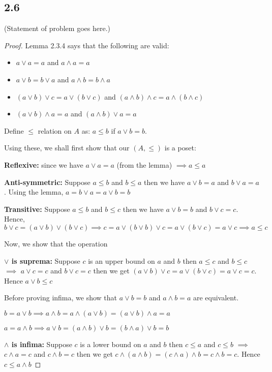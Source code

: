 \documentclass[12pt]{article}
\begin{document}
\subsection*{2.6}
(Statement of problem goes here.)\\

\begin{proof}
Lemma 2.3.4 says that the following are valid:
\begin{itemize}
    \item $a \vee a = a$ and $a \wedge a = a$
    \item $a \vee b = b \vee a$ and $a \wedge b = b \wedge a$
    \item $(a \vee b) \vee c = a \vee (b \vee c)$ and $(a \wedge b) \wedge c = a \wedge (b \wedge c)$
    \item $(a \vee b) \wedge a = a$ and $(a \wedge b) \vee a = a$
\end{itemize}

Define $\leq$ relation on $A$ as: $a \leq b$ if $a \vee b = b$.

Using these, we shall first show that our $(A, \leq)$ is a poset:

\textbf{Reflexive:} since we have $a \vee a = a$ (from the lemma) $\implies a \leq a$

\textbf{Anti-symmetric:} Suppose $a \leq b$ and $b \leq a$ then we have $a \vee b = a$ and $b \vee a = a$. Using the lemma, $a = b \vee a = a \vee b = b$

\textbf{Transitive:} Suppose $a \leq b$ and $b \leq c$ then we have $a \vee b = b$ and $b \vee c = c$. Hence, $b \vee c = (a \vee b) \vee (b \vee c) \implies c = a \vee (b \vee b) \vee c = a \vee (b \vee c) = a \vee c \implies a \leq c$

Now, we show that the operation 

\textbf{$\vee$ is suprema:} Suppose $c$ is an upper bound on $a$ and $b$ then $a \leq c$ and $b \leq c$ $\implies$ $a \vee c = c$ and $b \vee c = c$ then we get $(a \vee b) \vee c = a \vee (b \vee c) = a \vee c = c$. Hence $a \vee b \leq c$

Before proving infima, we show that $a \vee b = b$ and $a \wedge b = a$ are equivalent.

$b = a \vee b \implies a \wedge b = a \wedge (a \vee b) = (a \vee b) \wedge a = a$

$a = a \wedge b \implies a \vee b = (a \wedge b) \vee b = (b \wedge a) \vee b = b$

\textbf{$\wedge$ is infima:} Suppose $c$ is a lower bound on $a$ and $b$ then $c \leq a$ and $c \leq b$ $\implies$ $c \wedge a = c$ and $c \wedge b = c$ then we get $c \wedge (a \wedge b) = (c \wedge a) \wedge b = c \wedge b = c$. Hence $c \leq a \wedge b$
\end{proof}
\end{document}
